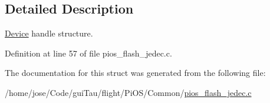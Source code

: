 \subsection{Detailed Description}
\hyperlink{struct_device}{Device} handle structure. 

Definition at line 57 of file pios\-\_\-flash\-\_\-jedec.\-c.



The documentation for this struct was generated from the following file\-:\begin{DoxyCompactItemize}
\item 
/home/jose/\-Code/gui\-Tau/flight/\-Pi\-O\-S/\-Common/\hyperlink{pios__flash__jedec_8c}{pios\-\_\-flash\-\_\-jedec.\-c}\end{DoxyCompactItemize}
